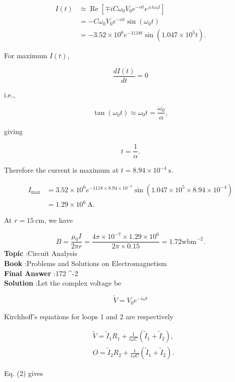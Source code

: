 \documentclass[10pt]{article}
\begin{document}
$$
\begin{aligned}
I(t) & \approx \operatorname{Re}\left[\mp i C \omega_{0} V_{0} e^{-\alpha t} e^{\pm i \omega_{0} t}\right] \\
&=-C \omega_{0} V_{0} e^{-\alpha t} \sin \left(\omega_{0} t\right) \\
&=-3.52 \times 10^{6} e^{-1118 t} \sin \left(1.047 \times 10^{5} t\right) .
\end{aligned}
$$

For maximum $I(t)$,

$$
\frac{d I(t)}{d t}=0
$$

i.e.,

$$
\tan \left(\omega_{0} t\right) \approx \omega_{0} t=\frac{\omega_{0}}{\alpha},
$$

giving

$$
t=\frac{1}{\alpha} .
$$

Therefore the current is maximum at $t=8.94 \times 10^{-4} \mathrm{~s}$.



$$
\begin{aligned}
I_{\max } &=3.52 \times 10^{6} e^{-1118 \times 8.94 \times 10^{-4}} \sin \left(1.047 \times 10^{5} \times 8.94 \times 10^{-4}\right) \\
&=1.29 \times 10^{6} \mathrm{~A} .
\end{aligned}
$$

 At $r=15 \mathrm{~cm}$, we have

$$
B=\frac{\mu_{0} I}{2 \pi r}=\frac{4 \pi \times 10^{-7} \times 1.29 \times 10^{6}}{2 \pi \times 0.15}=1.72 \mathrm{wbm}^{-2} .
$$
\textbf{Topic} :Circuit Analysis\\
\textbf{Book} :Problems and Solutions on Electromagnetism\\
\textbf{Final Answer} :172 ^{-2}\\


\textbf{Solution} :Let the complex voltage be

$$
\tilde{V}=V_{0} e^{-i \omega t}
$$

Kirchhoff's equations for loops 1 and 2 are respectively

$$
\begin{aligned}
&\tilde{V}=\tilde{I}_{1} R_{1}+\frac{1}{i \omega C}\left(\tilde{I}_{1}+\tilde{I}_{2}\right), \\
&O=\tilde{I}_{2} R_{2}+\frac{1}{i \omega C}\left(\tilde{I}_{1}+\tilde{I}_{2}\right) .
\end{aligned}
$$

Eq.
(2) gives
\end{document}
